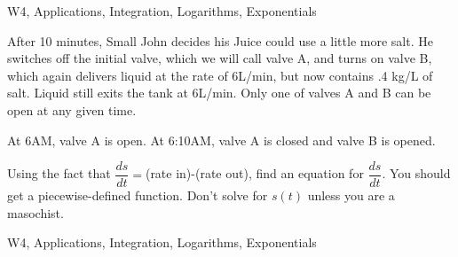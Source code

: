 \begin{tagblock}{W4, Applications, Integration, Logarithms, Exponentials}
\begin{question}
	
 After 10 minutes, Small John decides his Juice could use a little more salt. He switches off the initial valve, which we will call valve A, and turns on valve B, which again delivers liquid at the rate of 6L/min, but now contains .4 kg/L of salt. Liquid still exits the tank at 6L/min. Only one of valves A and B can be open at any given time. 

At 6AM, valve A is open. At 6:10AM, valve A is closed and valve B is opened. 

\bigskip

Using the fact that $\dfrac{ds}{dt}=$(rate in)-(rate out), find an equation for $\dfrac{ds}{dt}$. You should get a piecewise-defined function. Don't solve for $s(t)$ unless you are a masochist.

    
\begin{tags}
        W4, Applications, Integration, Logarithms, Exponentials
\end{tags}
    
\begin{diary}
\end{diary}
	
\begin{solution}

\end{solution}
	
\end{question}

\end{tagblock}


